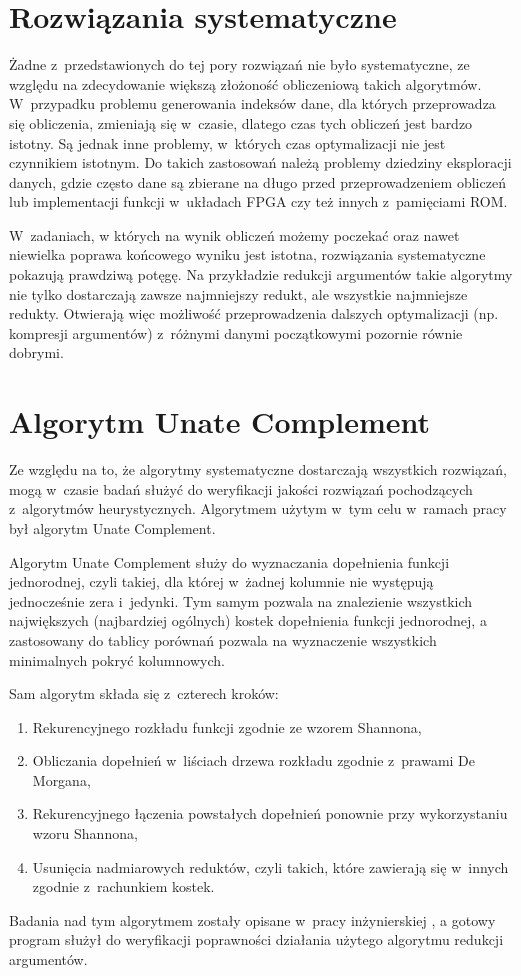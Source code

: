 \section{Rozwiązania systematyczne}

Żadne z~przedstawionych do tej pory rozwiązań nie było systematyczne,
ze względu na zdecydowanie większą złożoność obliczeniową takich algorytmów.
W~przypadku problemu generowania indeksów dane,
dla których przeprowadza się obliczenia,
zmieniają się w~czasie,
dlatego czas tych obliczeń jest bardzo istotny.
Są jednak inne problemy,
w~których czas optymalizacji nie jest czynnikiem istotnym.
Do takich zastosowań należą problemy dziedziny eksploracji danych,
gdzie często dane są zbierane na długo przed przeprowadzeniem obliczeń
lub implementacji funkcji w~układach FPGA czy też innych z~pamięciami ROM.

W~zadaniach, w których na wynik obliczeń możemy poczekać oraz nawet niewielka poprawa końcowego wyniku jest istotna,
rozwiązania systematyczne pokazują prawdziwą potęgę.
Na przykładzie redukcji argumentów takie algorytmy nie tylko dostarczają zawsze najmniejszy redukt,
ale wszystkie najmniejsze redukty.
Otwierają więc możliwość przeprowadzenia dalszych optymalizacji (np. kompresji argumentów) z~różnymi danymi początkowymi pozornie równie dobrymi.

\section{Algorytm Unate Complement}

Ze względu na to,
że algorytmy systematyczne dostarczają wszystkich rozwiązań,
mogą w~czasie badań służyć do weryfikacji jakości rozwiązań pochodzących z~algorytmów heurystycznych.
Algorytmem użytym w~tym celu w~ramach pracy był algorytm Unate Complement.

Algorytm Unate Complement służy do wyznaczania dopełnienia funkcji jednorodnej,
czyli takiej,
dla której w~żadnej kolumnie nie występują jednocześnie zera i~jedynki.
Tym samym pozwala na znalezienie wszystkich największych (najbardziej ogólnych) kostek dopełnienia funkcji jednorodnej,
a zastosowany do tablicy porównań pozwala na wyznaczenie wszystkich minimalnych pokryć kolumnowych.

Sam algorytm składa się z~czterech kroków:
\begin{enumerate}
\item Rekurencyjnego rozkładu funkcji zgodnie ze wzorem Shannona,
\item Obliczania dopełnień w~liściach drzewa rozkładu zgodnie z~prawami De Morgana,
\item Rekurencyjnego łączenia powstałych dopełnień ponownie przy wykorzystaniu wzoru Shannona,
\item Usunięcia nadmiarowych reduktów,
czyli takich,
które zawierają się w~innych zgodnie z~rachunkiem kostek.
\end{enumerate}
Badania nad tym algorytmem zostały opisane w~pracy inżynierskiej \cite{inzynierka},
a gotowy program służył do weryfikacji poprawności działania użytego algorytmu redukcji argumentów.

